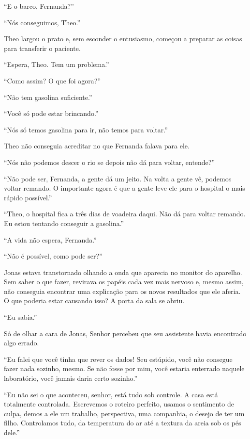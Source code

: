 ``E o barco, Fernanda?''

``Nós conseguimos, Theo.''

Theo largou o prato e, sem esconder o entusiasmo, começou a preparar as
coisas para transferir o paciente.

``Espera, Theo. Tem um problema.''

``Como assim? O que foi agora?''

``Não tem gasolina suficiente.''

``Você só pode estar brincando.''

``Nós só temos gasolina para ir, não temos para voltar.''

Theo não
conseguia acreditar no que Fernanda falava para ele.

``Nós não podemos
descer o rio se depois não dá para voltar, entende?''

``Não pode ser, Fernanda, a gente dá um jeito. Na volta a gente vê,
podemos voltar remando. O importante agora é que a gente leve ele para o
hospital o mais rápido possível.''

``Theo, o hospital fica a três dias de voadeira daqui. Não dá para
voltar remando. Eu estou tentando conseguir a gasolina.''

``A vida não espera, Fernanda.''

\asterisc


``Não é possível, como pode ser?''

Jonas estava transtornado olhando a onda que aparecia no monitor do
aparelho. Sem saber o que fazer, revirava os papéis cada vez mais nervoso
e, mesmo assim, não conseguia encontrar uma explicação para os novos
resultados que ele aferia. O que poderia estar causando isso? A porta da
sala se abriu.

``Eu sabia.''

Só de olhar a cara de Jonas, Senhor  percebeu que seu assistente havia
encontrado algo errado.

``Eu falei que você tinha que rever os dados! Seu estúpido, você não
consegue fazer nada sozinho, mesmo. Se não fosse por mim, você estaria
enterrado naquele laboratório, você jamais daria certo sozinho.''

``Eu não sei o que aconteceu, senhor, está tudo sob controle. A casa
está totalmente controlada. Escrevemos o roteiro perfeito, usamos o
sentimento de culpa, demos a ele um trabalho, perspectiva, uma
companhia, o desejo de ter um filho. Controlamos tudo, da temperatura do
ar até a textura da areia sob os pés dele.''

